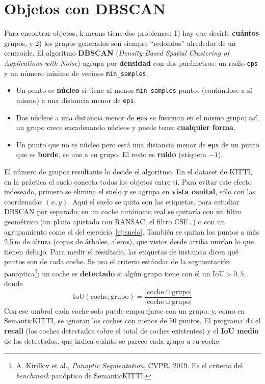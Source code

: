 \documentclass{article}
\begin{document}
\section{Objetos con DBSCAN}
Para encontrar objetos, k-means tiene dos problemas: 1) hay que decirle \textbf{cuántos} grupos, y 2) los grupos generados son siempre ``redondos'' alrededor de un centroide. El algoritmo \textbf{DBSCAN} (\textit{Density-Based Spatial Clustering of Applications with Noise}) agrupa por \textbf{densidad} con dos parámetros: un radio \texttt{eps} y un número mínimo de vecinos \texttt{min\_samples}.
\begin{itemize}
    \item Un punto es \textbf{núcleo} si tiene al menos \texttt{min\_samples} puntos (contándose a sí mismo) a una distancia menor  de \texttt{eps}.
    \item Dos núcleos a una distancia menor de \texttt{eps} se fusionan en el mismo grupo; así, un grupo crece encadenando núcleos y puede tener \textbf{cualquier forma}.
    \item Un punto que no es núcleo pero está una distancia menor de \texttt{eps} de un punto que es \textbf{borde}, se une a su grupo. El resto es \textbf{ruido} (etiqueta $-1$).
\end{itemize}
El número de grupos resultante lo decide el algoritmo. En el dataset de KITTI, en la práctica el suelo conecta todos los objetos entre sí. Para evitar este efecto indeseado, primero se elimina el suelo y se agrupa en \textbf{vista cenital}, sólo con las coordenadas $(x, y)$. Aquí el suelo se quita con las etiquetas, para estudiar DBSCAN por separado; en un coche autónomo real se quitaría con un filtro geométrico (un plano ajustado con RANSAC, el filtro CSF\dots) o con un agrupamiento como el del ejercicio~\ref{ej:suelo}. También se quitan los puntos a más 2{,}5\,m de altura (copas de árboles, aleros), que vistos desde arriba unirían lo que tienen debajo. Para medir el resultado, las etiquetas de instancia dicen qué puntos son de cada coche. Se usa el criterio estándar de la segmentación panóptica\footnote{A. Kirillov et al., \textit{Panoptic Segmentation}, CVPR, 2019. Es el criterio del \textit{benchmark} panóptico de SemanticKITTI.}: un coche es \textbf{detectado} si algún grupo tiene con él un $\text{IoU} > 0{,}5$, donde
\[
\text{IoU}(\text{coche}, \text{grupo}) = \frac{|\text{coche} \cap \text{grupo}|}{|\text{coche} \cup \text{grupo}|}
\]
Con ese umbral cada coche solo puede emparejarse con un grupo, y, como en SemanticKITTI, se ignoran los coches con menos de 50 puntos. El programa da el \textbf{recall} (los coches detectados sobre el total de coches existentes) y el \textbf{IoU medio} de los detectados, que indica cuánto se parece cada grupo a su coche.
\end{document}
